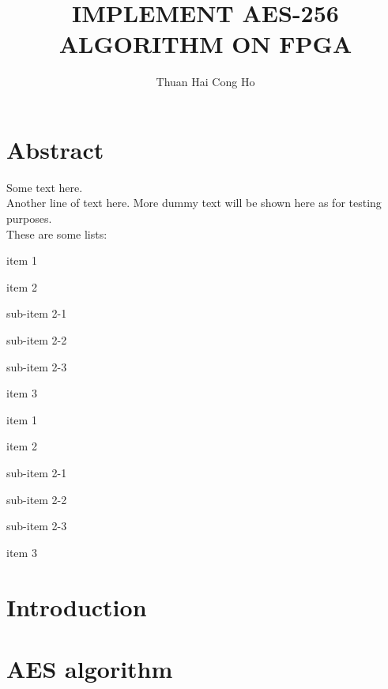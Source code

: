 \documentclass[a4paper, 12pt, twocolumn]{article}
\begin{document}
    \title{IMPLEMENT AES-256 ALGORITHM ON FPGA}
    \author{Thuan Hai Cong Ho}
    \maketitle %
    
    \section{Abstract}
    Some text here.\\
    Another line of text here. More dummy text will be shown here as for testing purposes.\\
    
    These are some lists:
    \begin{compactitem}
        \item item 1
        \item item 2
        \begin{compactitem}
            \item sub-item 2-1
            \item sub-item 2-2
            \item sub-item 2-3
        \end{compactitem}
        \item item 3
    \end{compactitem}

    \begin{compactenum}
        \item item 1
        \item item 2
            \begin{compactenum}
                \item sub-item 2-1
                \item sub-item 2-2
                \item sub-item 2-3
            \end{compactenum}
        \item item 3
    \end{compactenum}

    \section{Introduction}
    \blindtext[3]


    \section{AES algorithm}
    \blindtext[3]
\end{document}
